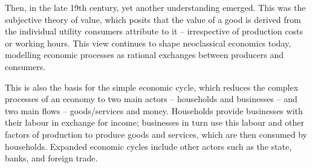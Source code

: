 \documentclass[
  a4paper,
  openany]{book}
\begin{document}
Then, in the late 19th century, yet another understanding emerged. This
was the subjective theory of value, which posits that the value of a
good is derived from the individual utility consumers attribute to it --
irrespective of production costs or working hours. This view continues
to shape neoclassical economics today, modelling economic processes as
rational exchanges between producers and consumers.

This is also the basis for the simple economic cycle, which reduces the
complex processes of an economy to two main actors -- households and
businesses -- and two main flows -- goods/services and money. Households
provide businesses with their labour in exchange for income; businesses
in turn use this labour and other factors of production to produce goods
and services, which are then consumed by households. Expanded economic
cycles include other actors such as the state, banks, and foreign trade.
\end{document}
